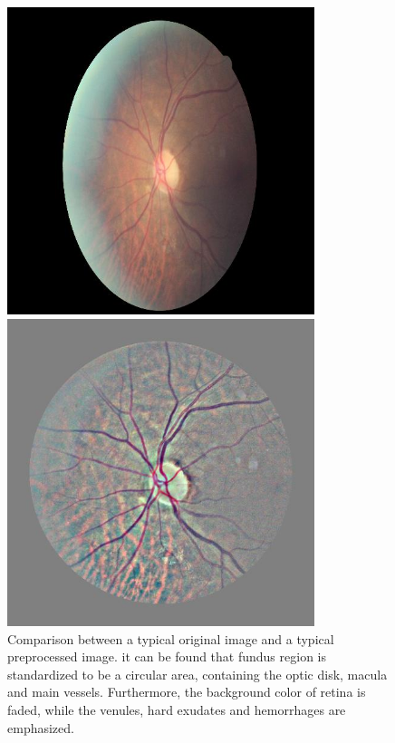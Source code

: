 \documentclass[../main.tex]{subfiles}
\begin{document}
\begin{figure}[htbp]
\centering
\begin{minipage}{7cm}
\centering
\includegraphics[width=0.8\textwidth]{original.jpeg}
\end{minipage}
\begin{minipage}{7cm}
\centering
\includegraphics[width=0.8\textwidth]{preprocessed.jpeg}
\end{minipage}
\caption{Comparison between a typical original image and a typical preprocessed image. it can be found that fundus region is standardized to be a circular area, containing the optic disk, macula and main vessels. Furthermore, the background color of retina is faded, while the venules, hard exudates and hemorrhages are emphasized.}
\label{fig:preprocessed}
\end{figure}
\end{document}

